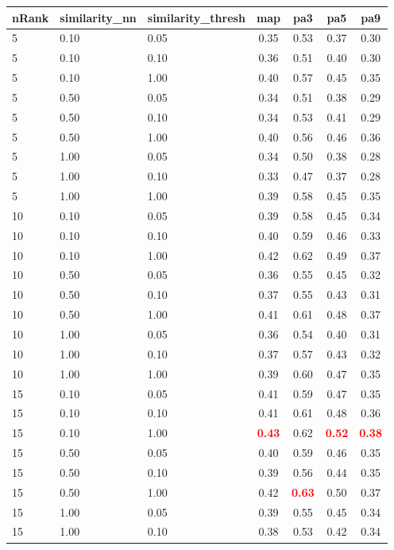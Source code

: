 \begin{tabular}{lllcccc} 
nRank & similarity\_nn & similarity\_thresh & map & pa3 & pa5 & pa9 \\ 
\hline 
 5 & 0.10 & 0.05 & 0.35 & 0.53 & 0.37 & 0.30 \\ 
 5 & 0.10 & 0.10 & 0.36 & 0.51 & 0.40 & 0.30 \\ 
 5 & 0.10 & 1.00 & 0.40 & 0.57 & 0.45 & 0.35 \\ 
 5 & 0.50 & 0.05 & 0.34 & 0.51 & 0.38 & 0.29 \\ 
 5 & 0.50 & 0.10 & 0.34 & 0.53 & 0.41 & 0.29 \\ 
 5 & 0.50 & 1.00 & 0.40 & 0.56 & 0.46 & 0.36 \\ 
 5 & 1.00 & 0.05 & 0.34 & 0.50 & 0.38 & 0.28 \\ 
 5 & 1.00 & 0.10 & 0.33 & 0.47 & 0.37 & 0.28 \\ 
 5 & 1.00 & 1.00 & 0.39 & 0.58 & 0.45 & 0.35 \\ 
10 & 0.10 & 0.05 & 0.39 & 0.58 & 0.45 & 0.34 \\ 
10 & 0.10 & 0.10 & 0.40 & 0.59 & 0.46 & 0.33 \\ 
10 & 0.10 & 1.00 & 0.42 & 0.62 & 0.49 & 0.37 \\ 
10 & 0.50 & 0.05 & 0.36 & 0.55 & 0.45 & 0.32 \\ 
10 & 0.50 & 0.10 & 0.37 & 0.55 & 0.43 & 0.31 \\ 
10 & 0.50 & 1.00 & 0.41 & 0.61 & 0.48 & 0.37 \\ 
10 & 1.00 & 0.05 & 0.36 & 0.54 & 0.40 & 0.31 \\ 
10 & 1.00 & 0.10 & 0.37 & 0.57 & 0.43 & 0.32 \\ 
10 & 1.00 & 1.00 & 0.39 & 0.60 & 0.47 & 0.35 \\ 
15 & 0.10 & 0.05 & 0.41 & 0.59 & 0.47 & 0.35 \\ 
15 & 0.10 & 0.10 & 0.41 & 0.61 & 0.48 & 0.36 \\ 
15 & 0.10 & 1.00 & \textbf{\textcolor{red}{0.43}} & 0.62 & \textbf{\textcolor{red}{0.52}} & \textbf{\textcolor{red}{0.38}} \\ 
15 & 0.50 & 0.05 & 0.40 & 0.59 & 0.46 & 0.35 \\ 
15 & 0.50 & 0.10 & 0.39 & 0.56 & 0.44 & 0.35 \\ 
15 & 0.50 & 1.00 & 0.42 & \textbf{\textcolor{red}{0.63}} & 0.50 & 0.37 \\ 
15 & 1.00 & 0.05 & 0.39 & 0.55 & 0.45 & 0.34 \\ 
15 & 1.00 & 0.10 & 0.38 & 0.53 & 0.42 & 0.34 \\ 

\end{tabular}
